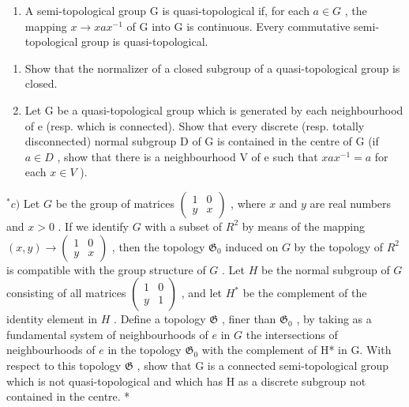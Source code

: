 \begin{enumerate}
\def\labelenumi{\arabic{enumi})}
\setcounter{enumi}{4}
\tightlist
\item
  A semi-topological group G is quasi-topological if, for each \(a \in G\) , the mapping \(x \to xax^{-1}\) of G into G is continuous. Every commutative semi-topological group is quasi-topological.
\end{enumerate}

\begin{enumerate}
\def\labelenumi{\alph{enumi})}
\item
  Show that the normalizer of a closed subgroup of a quasi-topological group is closed.
\item
  Let G be a quasi-topological group which is generated by each neighbourhood of e (resp. which is connected). Show that every discrete (resp. totally disconnected) normal subgroup D of G is contained in the centre of G (if \(a \in D\) , show that there is a neighbourhood V of e such that \(xax^{-1} = a\) for each \(x \in V\) ).
\end{enumerate}

\(^{*}c)\) Let \(G\) be the group of matrices \(\begin{pmatrix} 1 & 0 \\ y & x \end{pmatrix}\) , where \(x\) and \(y\) are real numbers and \(x > 0\) . If we identify \(G\) with a subset of \(R^2\) by means of the mapping \((x, y) \to \begin{pmatrix} 1 & 0 \\ y & x \end{pmatrix}\) , then the topology \(\mathfrak{G}_0\) induced on \(G\) by the topology of \(R^2\) is compatible with the group structure of \(G\) . Let \(H\) be the normal subgroup of \(G\) consisting of all matrices \(\begin{pmatrix} 1 & 0 \\ y & 1 \end{pmatrix}\) , and let \(H^*\) be the complement of the identity element in \(H\) . Define a topology \(\mathfrak{G}\) , finer than \(\mathfrak{G}_0\) , by taking as a fundamental system of neighbourhoods of \(e\) in \(G\) the intersections of neighbourhoods of \(e\) in the topology \(\mathfrak{G}_{0}\) with the complement of H* in G. With respect to this topology \(\mathfrak{G}\) , show that G is a connected semi-topological group which is not quasi-topological and which has H as a discrete subgroup not contained in the centre. *

